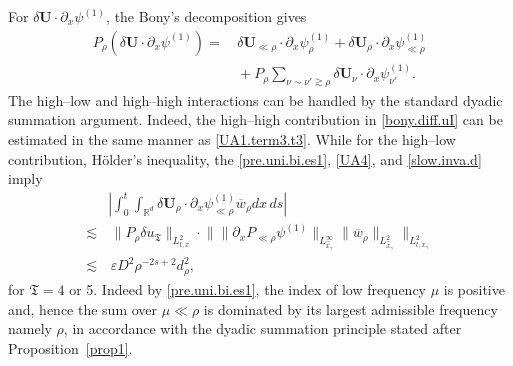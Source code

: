 \documentclass[11pt,letterpaper,reqno]{amsart}
\numberwithin{equation}{section}
\theoremstyle{definition}
\theoremstyle{remark}
\begin{document}
For  \(\delta  \mathbf{U} \cdot\partial_x\psi^{(1)}\), the Bony's decomposition gives
\begin{align}
  P_\rho(\delta  \mathbf{U} \cdot\partial_x\psi^{(1)}) 
=&\,
 \delta \mathbf{U}_{ \ll\rho} \cdot\partial_x\psi^{(1)}_\rho 
+
 \delta \mathbf{U}_{ \rho} \cdot\partial_x\psi^{(1)}_{\ll\rho} \nonumber\\
&\,+
P_\rho\sum_{\nu \sim \nu'\gtrsim\rho}
\delta \mathbf{U}_{ \nu} \cdot\partial_x\psi^{(1)}_{\nu'}.   \label{bony.diff.uI}
\end{align}
The high--low and high--high interactions can be handled by the standard
dyadic summation argument. 
Indeed,  the high--high contribution in \eqref{bony.diff.uI} can be estimated in the same manner as \eqref{UA1.term3.t3}.
While for the high--low contribution, H\"older's inequality, the
\eqref{pre.uni.bi.es1}, \eqref{UA4}, and \eqref{slow.inva.d} imply
\[
\begin{aligned}
 &\left|
\int_0^t\int_{\mathbb R^d}
 \delta \mathbf{U}_{ \rho} \cdot\partial_x\psi^{(1)}_{\ll\rho} \overline{w}_\rho d x \, ds
\right|\\
\lesssim&\, \| P_\rho\delta u_{\mathfrak{T}} \|_{L^2_{t,x}}    \cdot
   \big \| \|  \partial_x P_{ \ll \rho} \psi^{(1)} \|_{L^\infty_{\widehat{x}_\gamma}} \| 
 \overline{w}_\rho \|_{L^2_{\widehat{x}_\gamma}} \big\|_{L^2_{ t,x_\gamma}}
\\
\lesssim &\,  \varepsilon D^2 \rho^{-2s+2} d_\rho^2,
\end{aligned}
\]
for \(\mathfrak{T} =4\) or 5.
Indeed by \eqref{pre.uni.bi.es1},  the index of low frequency \(\mu\) is positive and, hence the sum over \(\mu\ll\rho\) is dominated by its largest admissible frequency  namely \(\rho\), in accordance with the dyadic summation principle stated after Proposition~\ref{prop1}.
\end{document}
